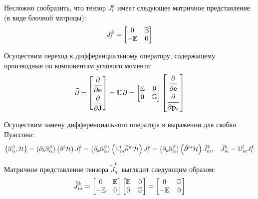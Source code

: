 \documentclass[12pt]{article}
\newcommand{\bbU}{\mathbb{U}}
\newcommand{\bbG}{\mathbb{G}}
\newcommand{\bbE}{\mathbb{E}}
\newcommand{\bbS}{\mathbb{S}}
\newcommand{\mH}{\mathcal{H}}
\newcommand{\lb}{\left(}
\newcommand{\rb}{\right)}
\newcommand{\lcb}{\left\{}
\newcommand{\rcb}{\right\}}
\begin{document}
Несложно сообразить, что тензор $J^{k}_{l}$ имеет следующее матричное представление (в виде блочной матрицы):
\begin{gather}
	J^{k}_{l} =
	\begin{bmatrix}
		0 & \bbE \\
		-\bbE & 0
	\end{bmatrix} \notag
\end{gather}

Осуществим переход к дифференциальному оператору, содержащему производные по компонентам углового момента: 
\begin{gather}
	\widetilde{\partial} = 
	\begin{bmatrix}
		\dfrac{\strut\partial}{\strut\partial \mathbf{e}} \\
		\dfrac{\strut\partial}{\partial \mathbf{J}} \\
	\end{bmatrix} = \bbU \, \partial =  
	\begin{bmatrix}
		\bbE & 0 \\
		0 & \bbG
	\end{bmatrix}
	\begin{bmatrix}
		\dfrac{\strut\partial}{\strut\partial \mathbf{e}} \\
		\dfrac{\strut\partial}{\strut\partial \mathbf{p}_e} \\
	\end{bmatrix} \notag
\end{gather}

Осуществим замену дифференциального оператора в выражении для скобки Пуассона:
\begin{gather}
	\lcb \bbS^\beta_\alpha , \mH \rcb = \lb \partial_k \bbS^\beta_\alpha \rb \lb \partial^l \mH \rb J^k_l = \lb \partial_k \bbS^\beta_\alpha \rb \lb \bbU^l_m \widetilde{\partial}^m \mH \rb J^k_l = \lb \partial_k \bbS^\beta_\alpha \rb \lb \widetilde{\partial}^m \mH \rb \widetilde{J}^k_m, \quad \widetilde{J}^k_m = \bbU^l_m J^k_l \notag 
\end{gather}

Матричное представление тензора $\widetilde{J}_m^k$ выглядит следующим образом:
\begin{gather}
	\widetilde{J}_m^k = 
	\begin{bmatrix}
		0 & \bbE \\
		-\bbE & 0
	\end{bmatrix} 
	\begin{bmatrix}
		\bbE & 0 \\
		0 & \bbG
	\end{bmatrix} = 
	\begin{bmatrix}
		0 & \bbG \\
		-\bbE & 0
	\end{bmatrix} \notag
\end{gather}
\end{document}
